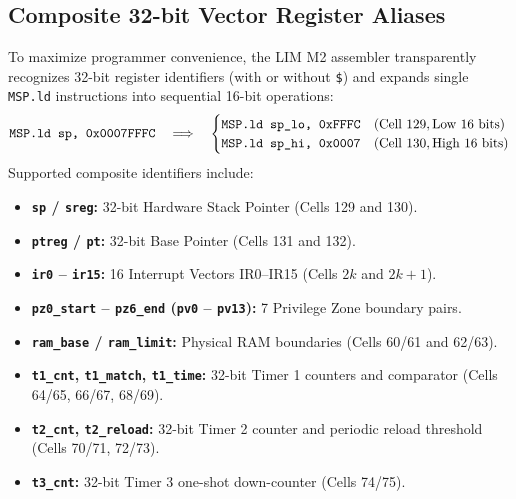 \documentclass[11pt,a4paper]{article}
\begin{document}
\subsection{Composite 32-bit Vector Register Aliases}
To maximize programmer convenience, the LIM M2 assembler transparently recognizes 32-bit register identifiers (with or without \texttt{\$}) and expands single \texttt{MSP.ld} instructions into sequential 16-bit operations:
\begin{equation*}
    \text{\texttt{MSP.ld sp, 0x0007FFFC}} \quad \Longrightarrow \quad
    \begin{cases}
        \text{\texttt{MSP.ld sp\_lo, 0xFFFC}} & (\text{Cell } 129, \text{Low 16 bits}) \\
        \text{\texttt{MSP.ld sp\_hi, 0x0007}} & (\text{Cell } 130, \text{High 16 bits})
    \end{cases}
\end{equation*}
Supported composite identifiers include:
\begin{itemize}[leftmargin=10pt,itemsep=1pt]
    \item \textbf{\texttt{sp} / \texttt{sreg}:} 32-bit Hardware Stack Pointer (Cells 129 and 130).
    \item \textbf{\texttt{ptreg} / \texttt{pt}:} 32-bit Base Pointer (Cells 131 and 132).
    \item \textbf{\texttt{ir0} -- \texttt{ir15}:} 16 Interrupt Vectors IR0--IR15 (Cells \(2k\) and \(2k+1\)).
    \item \textbf{\texttt{pz0\_start} -- \texttt{pz6\_end} (\texttt{pv0} -- \texttt{pv13}):} 7 Privilege Zone boundary pairs.
    \item \textbf{\texttt{ram\_base} / \texttt{ram\_limit}:} Physical RAM boundaries (Cells 60/61 and 62/63).
    \item \textbf{\texttt{t1\_cnt}, \texttt{t1\_match}, \texttt{t1\_time}:} 32-bit Timer 1 counters and comparator (Cells 64/65, 66/67, 68/69).
    \item \textbf{\texttt{t2\_cnt}, \texttt{t2\_reload}:} 32-bit Timer 2 counter and periodic reload threshold (Cells 70/71, 72/73).
    \item \textbf{\texttt{t3\_cnt}:} 32-bit Timer 3 one-shot down-counter (Cells 74/75).
\end{itemize}

\end{document}
